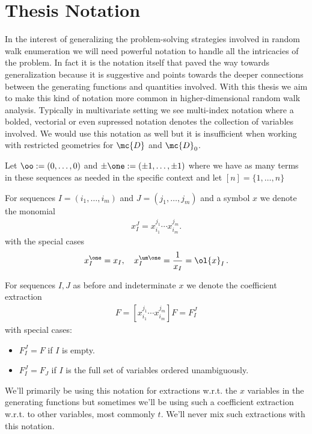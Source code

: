 \section{Thesis Notation}
In the interest of generalizing the problem-solving strategies involved in random walk enumeration we will need powerful notation to handle all the intricacies of the problem. In fact it is the notation itself that paved the way towards generalization because it is suggestive and points towards the deeper connections between the generating functions and quantities involved. With this thesis we aim to make this kind of notation more common in higher-dimensional random walk analysis. Typically in multivariate setting we see multi-index notation where a bolded, vectorial or even supressed notation denotes the collection of variables involved. We would use this notation as well but it is insufficient when working with restricted geometries for $\mc{D}$ and $\mc{D}_0$.
\begin{definition} Let $\oo := (0,\ldots,0)$ and $\pm \one := (\pm 1,\ldots, \pm 1)$ where we have as many terms in these sequences as needed in the specific context and let $[n] = \{1,\ldots, n\}$
\end{definition}
\begin{definition} For sequences $I = (i_1,\ldots, i_m)$ and $J = (j_1,\ldots, j_m)$ and a symbol $x$ we denote the monomial
\begin{align}
	x_I^J = x_{i_1}^{j_1}\cdots x_{i_m}^{j_m}.
\end{align}
with the special cases
\begin{align}
	x_I^{\one} = x_I, \quad x_I^{\um\one} = \frac{1}{x_I} = \ol{x}_I\,.
\end{align}
\end{definition}
\begin{definition} For sequences $I,J$ as before and indeterminate $x$ we denote the coefficient extraction 
\begin{align}
	[x_I^J] F= [x_{i_1}^{j_1}\cdots x_{i_m}^{j_m}]F = F_I^J
\end{align}
with special cases:
\begin{itemize}
	\item $F_I^{J} = F$ if $I$ is empty.
	\item $F_I^J = F_J$ if $I$ is the full set of variables ordered unambiguously.
\end{itemize}
We'll primarily be using this notation for extractions w.r.t. the $x$ variables in the generating functions but sometimes we'll be using such a coefficient extraction w.r.t. to other variables, most commonly $t$. We'll never mix such extractions with this notation.
\end{definition}
